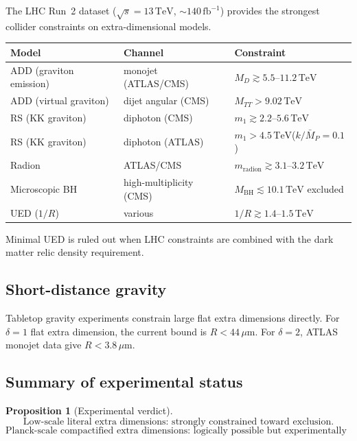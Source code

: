 \documentclass[12pt]{article}
\theoremstyle{plain}
\newtheorem{proposition}[theorem]{Proposition}
\theoremstyle{definition}
\numberwithin{equation}{section}
\begin{document}
The LHC Run~2 dataset ($\sqrt{s}=13\,\mathrm{TeV}$,
$\sim140\,\mathrm{fb}^{-1}$) provides the strongest collider
constraints on extra-dimensional models.

\begin{center}
\begin{tabular}{lll}
\toprule
Model & Channel & Constraint\\
\midrule
ADD (graviton emission)
  & monojet (ATLAS/CMS)
  & $M_D\gtrsim 5.5$--$11.2\,\mathrm{TeV}$\\
ADD (virtual graviton)
  & dijet angular (CMS)
  & $M_{TT}>9.02\,\mathrm{TeV}$\\
RS (KK graviton)
  & diphoton (CMS)
  & $m_1\gtrsim 2.2$--$5.6\,\mathrm{TeV}$\\
RS (KK graviton)
  & diphoton (ATLAS)
  & $m_1>4.5\,\mathrm{TeV}$\;($k/\bar{M}_P=0.1$)\\
Radion
  & ATLAS/CMS
  & $m_{\mathrm{radion}}\gtrsim 3.1$--$3.2\,\mathrm{TeV}$\\
Microscopic BH
  & high-multiplicity (CMS)
  & $M_{\mathrm{BH}}\lesssim 10.1\,\mathrm{TeV}$ excluded\\
UED ($1/R$)
  & various
  & $1/R\gtrsim 1.4$--$1.5\,\mathrm{TeV}$\\
\bottomrule
\end{tabular}
\end{center}

Minimal UED is ruled out when LHC constraints are combined with
the dark matter relic density requirement.

\subsection{Short-distance gravity}

Tabletop gravity experiments constrain large flat extra dimensions
directly.  For $\delta=1$ flat extra dimension, the current bound
is $R<44\,\mu\mathrm{m}$.  For $\delta=2$, ATLAS monojet data
give $R<3.8\,\mu\mathrm{m}$.

\subsection{Summary of experimental status}

\begin{proposition}[Experimental verdict]\label{prop:experiment}
\begin{equation}
\boxed{\text{Low-scale literal extra dimensions:
strongly constrained toward exclusion.}}
\end{equation}
\begin{equation}
\boxed{\text{Planck-scale compactified extra dimensions:
logically possible but experimentally inaccessible.}}
\end{equation}
\end{proposition}
\end{document}
